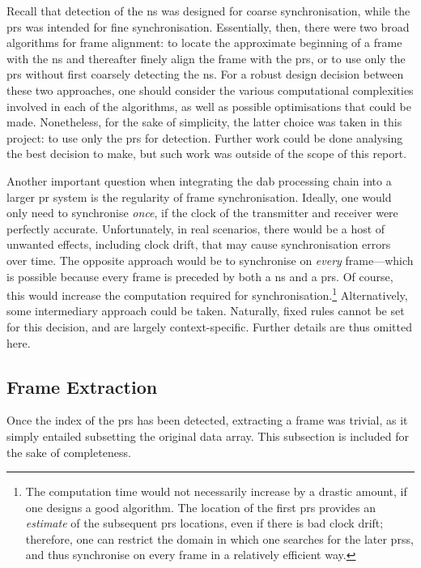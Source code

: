 \documentclass[class=report,11pt,crop=false]{standalone}
\begin{document}
Recall that detection of the \gls{ns} was designed for coarse synchronisation, while the \gls{prs} was intended for fine synchronisation. Essentially, then, there were two broad algorithms for frame alignment: to locate the approximate beginning of a frame with the \gls{ns} and thereafter finely align the frame with the \gls{prs}, or to use only the \gls{prs} without first coarsely detecting the \gls{ns}. For a robust design decision between these two approaches, one should consider the various computational complexities involved in each of the algorithms, as well as possible optimisations that could be made. Nonetheless, for the sake of simplicity, the latter choice was taken in this project: to use only the \gls{prs} for detection. Further work could be done analysing the best decision to make, but such work was outside of the scope of this report.

Another important question when integrating the \gls{dab} processing chain into a larger \gls{pr} system is the regularity of frame synchronisation. Ideally, one would only need to synchronise \emph{once}, if the clock of the transmitter and receiver were perfectly accurate. Unfortunately, in real scenarios, there would be a host of unwanted effects, including clock drift, that may cause synchronisation errors over time. The opposite approach would be to synchronise on \emph{every} frame---which is possible because every frame is preceded by both a \gls{ns} and a \gls{prs}. Of course, this would increase the computation required for synchronisation.\footnote{The computation time would not necessarily increase by a drastic amount, if one designs a good algorithm. The location of the first \gls{prs} provides an \emph{estimate} of the subsequent \gls{prs} locations, even if there is bad clock drift; therefore, one can restrict the domain in which one searches for the later \gls{prs}s, and thus synchronise on every frame in a relatively efficient way.} Alternatively, some intermediary approach could be taken. Naturally, fixed rules cannot be set for this decision, and are largely context-specific. Further details are thus omitted here.

\subsection{Frame Extraction \label{subsect:dab-proc_frame-extract}}
Once the index of the \gls{prs} has been detected, extracting a frame was trivial, as it simply entailed subsetting the original data array. This subsection is included for the sake of completeness.
\end{document}
